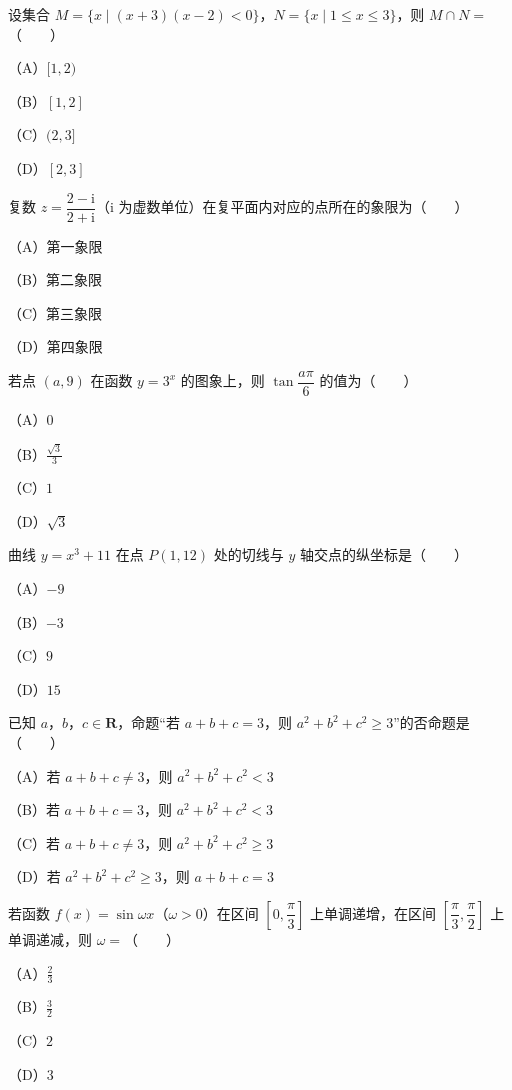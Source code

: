 \begin{question}
设集合 $M=\{x\mid (x+3)(x-2)<0\}$，$N=\{x\mid 1\leqslant x\leqslant 3\}$，则 $M\cap N=$\mbox{（　　）}

（A）$[1,2)$

（B）$[1,2]$

（C）$(2,3]$

（D）$[2,3]$

\end{question}
\begin{question}
复数 $z=\dfrac{2-\mathrm i}{2+\mathrm i}$（$\mathrm i$ 为虚数单位）在复平面内对应的点所在的象限为\mbox{（　　）}

（A）第一象限

（B）第二象限

（C）第三象限

（D）第四象限

\end{question}
\begin{question}
若点 $(a,9)$ 在函数 $y=3^x$ 的图象上，则 $\tan\dfrac{a\pi}{6}$ 的值为\mbox{（　　）}

（A）$0$

（B）$\frac{\sqrt3}{3}$

（C）$1$

（D）$\sqrt3$

\end{question}
\begin{question}
曲线 $y=x^3+11$ 在点 $P(1,12)$ 处的切线与 $y$ 轴交点的纵坐标是\mbox{（　　）}

（A）$-9$

（B）$-3$

（C）$9$

（D）$15$

\end{question}
\begin{question}
已知 $a$，$b$，$c\in\mathbf R$，命题“若 $a+b+c=3$，则 $a^2+b^2+c^2\geqslant 3$”的否命题是\mbox{（　　）}

（A）若 $a+b+c\neq 3$，则 $a^2+b^2+c^2<3$

（B）若 $a+b+c=3$，则 $a^2+b^2+c^2<3$

（C）若 $a+b+c\neq 3$，则 $a^2+b^2+c^2\geqslant 3$

（D）若 $a^2+b^2+c^2\geqslant 3$，则 $a+b+c=3$

\end{question}
\begin{question}
若函数 $f(x)=\sin\omega x$（$\omega>0$）在区间 $\left[0,\dfrac{\pi}{3}\right]$ 上单调递增，在区间 $\left[\dfrac{\pi}{3},\dfrac{\pi}{2}\right]$ 上单调递减，则 $\omega=$\mbox{（　　）}

（A）$\frac23$

（B）$\frac32$

（C）$2$

（D）$3$

\end{question}
